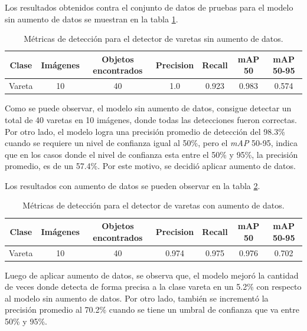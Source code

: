 Los resultados obtenidos contra el conjunto de datos de pruebas para el modelo sin aumento de datos se muestran en la tabla \ref{tab:resultadosVareta}.

\begin{table}[h]
	\centering
	\caption{Métricas de detección para el detector de varetas sin aumento de datos.}
	\begin{tabular}{c c c c c c c}    
		\toprule
		\textbf{Clase}&\textbf{Imágenes}&\textbf{Objetos encontrados}&\textbf{Precision} &\textbf{Recall}&\textbf{mAP 50}&\textbf{mAP 50-95}\\
		\midrule
		Vareta & 10 & 40 & 1.0 & 0.923 & 0.983 & 0.574\\		
		\bottomrule
		\hline
	\end{tabular}
	\label{tab:resultadosVareta}
\end{table}

Como se puede observar, el modelo sin aumento de datos, consigue detectar un total de 40 varetas en 10 imágenes, donde todas las detecciones fueron correctas. Por otro lado, el modelo logra una precisión promedio de detección del 98.3\% cuando se requiere un nivel de confianza igual al 50\%, pero el \textit{mAP} 50-95, indica que en los casos donde el nivel de confianza esta entre el 50\% y 95\%, la precisión promedio, es de un 57.4\%. Por este motivo, se decidió aplicar aumento de datos.

Los resultados con aumento de datos se pueden observar en la tabla \ref{tab:resultadosVaretaConAug}.

\begin{table}[h]
	\centering
	\caption{Métricas de detección para el detector de varetas con aumento de datos.}
	\begin{tabular}{c c c c c c c}    
		\toprule
		\textbf{Clase}&\textbf{Imágenes}&\textbf{Objetos encontrados}&\textbf{Precision} &\textbf{Recall}&\textbf{mAP 50}&\textbf{mAP 50-95}\\
		\midrule
		Vareta & 10 & 40 & 0.974 & 0.975 & 0.976 & 0.702\\		
		\bottomrule
		\hline
	\end{tabular}
	\label{tab:resultadosVaretaConAug}
\end{table}

Luego de aplicar aumento de datos, se observa que, el modelo mejoró la cantidad de veces donde detecta de forma precisa a la clase vareta en un 5.2\% con respecto al modelo sin aumento de datos. Por otro lado, también se incrementó la precisión promedio al 70.2\% cuando se tiene un umbral de confianza que va entre 50\% y 95\%.

